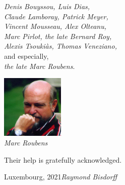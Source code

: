 \vspace{0.5cm}
\begin{minipage}{7cm}
\emph{Denis Bouyssou, Luis Dias,}\\ 
\emph{Claude Lamboray, Patrick Meyer,}\\
\emph{Vincent Mousseau, Alex Olteanu,}\\
\emph{Marc Pirlot, the late Bernard Roy,}\\
\emph{Alexis Tsouki\`as, Thomas Veneziano,}\\
and especially,\\
\emph{the late Marc Roubens}.
\end{minipage}\quad
\begin{minipage}{3cm}
\includegraphics[width=3cm]{Figures/Marc-Roubens.jpg} \\
{\small \emph{Marc Roubens}}
\end{minipage}

\vspace{0.3cm}
Their help is gratefully acknowledged.

\vspace{\baselineskip}
\begin{flushright}\noindent
Luxembourg, 2021\hfill {\it Raymond Bisdorff}\\
\end{flushright}


